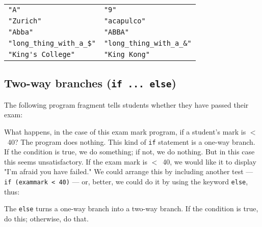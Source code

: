 \begin{tabular}{ll}
\verb!"A"! & \verb!"9"!\\
\verb!"Zurich"! & \verb!"acapulco"!\\
\verb!"Abba"! & \verb!"ABBA"!\\
\verb!"long_thing_with_a_$"! & \verb!"long_thing_with_a_&"!\\
\verb!"King's College"! & \verb!"King Kong"!\\
\end{tabular}

\subsection{Two-way branches (\texttt{if ... else})}
\label{sec:two-way-branches}

The following program fragment tells students whether they have passed
their exam: 


What happens, in the case of this exam mark program, if a student's mark is
$<$~40?  The program does nothing.  This kind of \verb!if! statement is a
one-way branch.  If the condition is true, we do something; if not, we do
nothing.  But in this case
this seems unsatisfactory.  If the exam mark is $<$~40, we would like
it to display "I'm afraid you have failed."  We could arrange this by
including another test --- \verb!if (exammark < 40)!  --- or, better, we could
do it by using the keyword \verb!else!, thus:


The  \verb!else! turns a one-way branch into a two-way branch.  If the
condition is true, do this; otherwise, do that.





